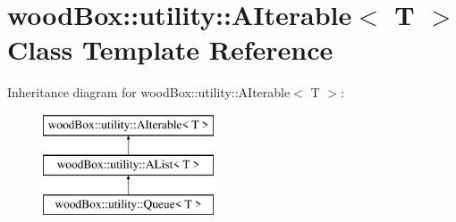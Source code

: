 \hypertarget{classwood_box_1_1utility_1_1_a_iterable}{}\section{wood\+Box\+:\+:utility\+:\+:A\+Iterable$<$ T $>$ Class Template Reference}
\label{classwood_box_1_1utility_1_1_a_iterable}
Inheritance diagram for wood\+Box\+:\+:utility\+:\+:A\+Iterable$<$ T $>$\+:\begin{figure}[H]
\begin{center}
\leavevmode
\includegraphics[height=3.000000cm]{classwood_box_1_1utility_1_1_a_iterable}
\end{center}
\end{figure}

